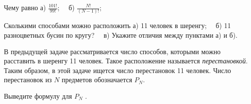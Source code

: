 \begin{ex}\label{u20}
	Чему равно а) $\frac{101!}{99!}$;~~  б) $\frac{N!}{(N-1)!}$;  
\end{ex}

\begin{thm}
	Сколькими способами можно расположить а) 11 человек в шеренгу;~~ б) 11 разноцветных бусин по кругу?~~ в) Укажите отличия между пунктами а) и б).  
\end{thm}

В предыдущей задаче рассматривается число способов, которыми можно расставить в шеренгу 11 человек. Такое расположение называется \textit{перестановкой}. Таким образом, в этой задаче ищется число перестановок 11 человек. Число перестановок из $N$ предметов обозначается $P_N$.

\begin{thm}\label{3.6}
	Выведите формулу для $P_N$ .
\end{thm}